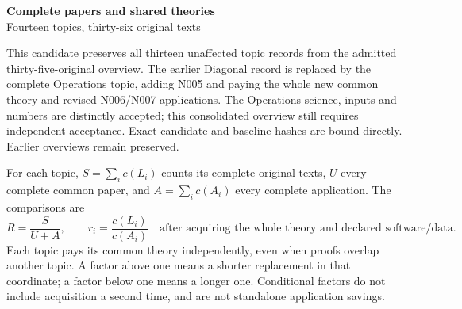 \documentclass[11pt,a4paper]{article}
\begin{document}
\begin{center}\Large\textbf{Complete papers and shared theories}\\[4pt]
\normalsize Fourteen topics, thirty-six original texts\end{center}
This candidate preserves all thirteen unaffected topic records from the admitted thirty-five-original overview. The earlier Diagonal record is replaced by the complete Operations topic, adding N005 and paying the whole new common theory and revised N006/N007 applications. The Operations science, inputs and numbers are distinctly accepted; this consolidated overview still requires independent acceptance. Exact candidate and baseline hashes are bound directly. Earlier overviews remain preserved.

For each topic, $S=\sum_i c(L_i)$ counts its complete original texts, $U$ every complete common paper, and $A=\sum_i c(A_i)$ every complete application. The comparisons are
\[
 R=\frac{S}{U+A},\qquad r_i=\frac{c(L_i)}{c(A_i)}
 \quad\text{after acquiring the whole theory and declared software/data.}
\]
Each topic pays its common theory independently, even when proofs overlap another topic. A factor above one means a shorter replacement in that coordinate; a factor below one means a longer one. Conditional factors do not include acquisition a second time, and are not standalone application savings.
\end{document}
